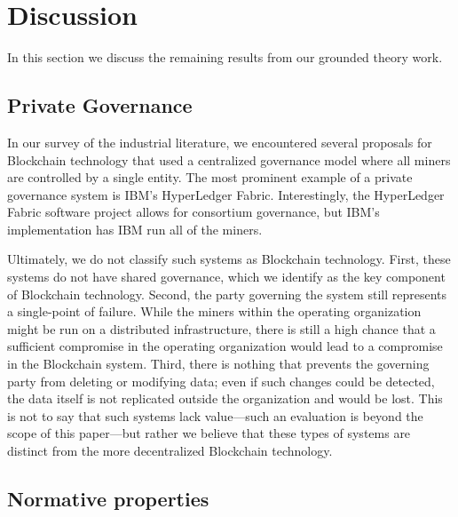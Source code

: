 \section{Discussion}
In this section we discuss the remaining results from our grounded theory work.

\subsection{Private Governance}
\label{sec:private-blockchain}
In our survey of the industrial literature, we encountered several proposals for Blockchain technology that used a centralized governance model where all miners are controlled by a single entity.
The most prominent example of a private governance system is IBM's HyperLedger Fabric.
Interestingly, the HyperLedger Fabric software project allows for consortium governance, but IBM's implementation has IBM run all of the miners.

Ultimately, we do not classify such systems as Blockchain technology.
First, these systems do not have shared governance, which we identify as the key component of Blockchain technology.
Second, the party governing the system still represents a single-point of failure.
While the miners within the operating organization might be run on a distributed infrastructure, there is still a high chance that a sufficient compromise in the operating organization would lead to a compromise in the Blockchain system.
Third, there is nothing that prevents the governing party from deleting or modifying data; even if such changes could be detected, the data itself is not replicated outside the organization and would be lost.
This is not to say that such systems lack value---such an evaluation is beyond the scope of this paper---but rather we believe that these types of systems are distinct from the more decentralized Blockchain technology.

\subsection{Normative properties}
\label{sec:normative}

